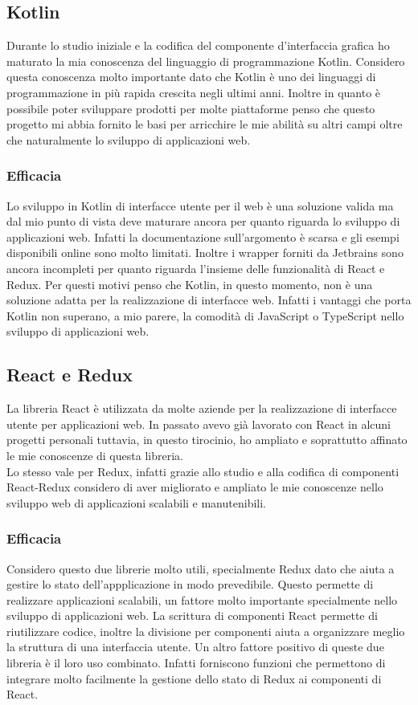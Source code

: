 \subsection{Kotlin}
Durante lo studio iniziale e la codifica del componente d'interfaccia grafica ho maturato la mia conoscenza del linguaggio di programmazione Kotlin. Considero questa conoscenza molto importante dato che Kotlin è uno dei linguaggi di programmazione in più rapida crescita negli ultimi anni. Inoltre in quanto è possibile poter sviluppare prodotti per molte piattaforme penso che questo progetto mi abbia fornito le basi per arricchire le mie abilità su altri campi oltre che naturalmente lo sviluppo di applicazioni web.

\subsubsection*{Efficacia}
Lo sviluppo in Kotlin di interfacce utente per il web è una soluzione valida ma dal mio punto di vista deve maturare ancora per quanto riguarda lo sviluppo di applicazioni web. Infatti la documentazione sull'argomento è scarsa e gli esempi disponibili online sono molto limitati. Inoltre i wrapper forniti da Jetbrains sono ancora incompleti per quanto riguarda l'insieme delle funzionalità di React e Redux. Per questi motivi penso che Kotlin, in questo momento, non è una soluzione adatta per la realizzazione di interfacce web. Infatti i vantaggi che porta Kotlin non superano, a mio parere, la comodità di JavaScript o TypeScript nello sviluppo di applicazioni web.

\subsection{React e Redux}
La libreria React è utilizzata da molte aziende per la realizzazione di interfacce utente per applicazioni web. In passato avevo già lavorato con React in alcuni progetti personali tuttavia, in questo tirocinio, ho ampliato e soprattutto affinato le mie conoscenze di questa libreria. \\
Lo stesso vale per Redux, infatti grazie allo studio e alla codifica di componenti React-Redux considero di aver migliorato e ampliato le mie conoscenze nello sviluppo web di applicazioni scalabili e manutenibili.

\subsubsection*{Efficacia}
Considero questo due librerie molto utili, specialmente Redux dato che aiuta a gestire lo stato dell'appplicazione in modo prevedibile. Questo permette di realizzare applicazioni scalabili, un fattore molto importante specialmente nello sviluppo di applicazioni web. La scrittura di componenti React permette di riutilizzare codice, inoltre la divisione per componenti aiuta a organizzare meglio la struttura di una interfaccia utente. Un altro fattore positivo di queste due libreria è il loro uso combinato. Infatti forniscono funzioni che permettono di integrare molto facilmente la gestione dello stato di Redux ai componenti di React.

